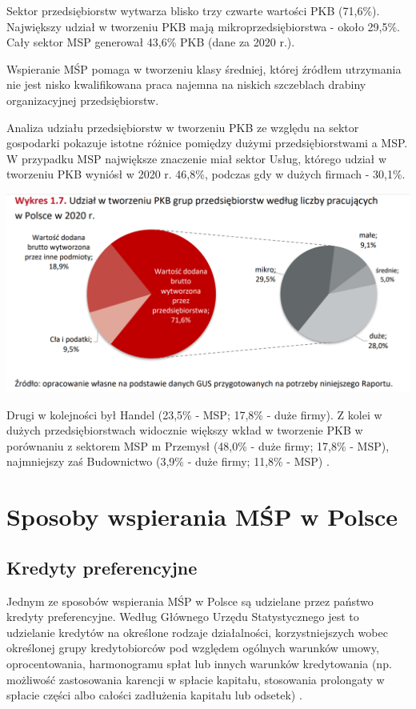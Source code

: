 \documentclass[11pt]{article}
\begin{document}
Sektor przedsiębiorstw wytwarza blisko trzy czwarte wartości PKB (71,6\%). Największy udział w tworzeniu
PKB mają mikroprzedsiębiorstwa - około 29,5\%. Cały sektor MSP generował 43,6\% PKB (dane za 2020 r.)\cite{RaportPARPoMSP}.

Wspieranie MŚP pomaga w tworzeniu klasy średniej, której źródłem utrzymania nie jest nisko kwalifikowana praca najemna
na niskich szczeblach drabiny organizacyjnej przedsiębiorstw.
\medskip

Analiza udziału przedsiębiorstw w tworzeniu PKB ze względu na sektor gospodarki pokazuje istotne różnice
pomiędzy dużymi przedsiębiorstwami a MSP. W przypadku MSP największe znaczenie miał sektor Usług, którego udział w tworzeniu PKB wyniósł
w 2020 r. 46,8\%, podczas gdy w dużych firmach - 30,1\%.

\begin{center}
  \includegraphics[scale=0.6]{img/udzialMSP.png}
\end{center}

Drugi w kolejności był Handel (23,5\% - MSP; 17,8\% - duże
firmy). Z kolei w dużych przedsiębiorstwach widocznie większy wkład w tworzenie PKB
w porównaniu z sektorem MSP m Przemysł (48,0\% - duże firmy; 17,8\% - MSP),
najmniejszy zaś Budownictwo (3,9\% - duże firmy; 11,8\% - MSP) \cite{RaportPARPoMSP}.

\section*{Sposoby wspierania MŚP w Polsce}

\subsection*{Kredyty preferencyjne}

Jednym ze sposobów wspierania MŚP w Polsce są udzielane przez państwo kredyty preferencyjne.
Według Głównego Urzędu Statystycznego jest to udzielanie kredytów na określone rodzaje działalności,
korzystniejszych wobec określonej grupy kredytobiorców pod względem ogólnych warunków umowy, oprocentowania,
harmonogramu spłat lub innych warunków kredytowania (np. możliwość zastosowania karencji w spłacie kapitału,
stosowania prolongaty w spłacie części albo całości zadłużenia kapitału lub odsetek) \cite{DefKredytPref}.
\end{document}
